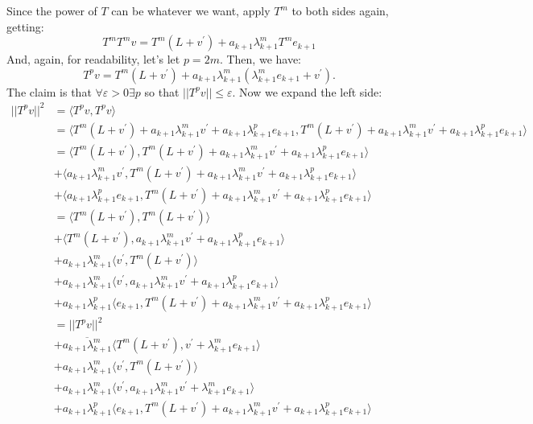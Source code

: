 \documentclass{article}
\begin{document}
Since the power of $T$ can be whatever we want, apply $T^{m}$ to both sides again, getting:
\begin{equation*}
T^{m}T^{m}v = T^{m}(L + v^{\prime}) + a_{k+1}\lambda^{m}_{k+1}T^{m}e_{k+1}
\end{equation*}
And, again, for readability, let's let $p = 2m$. Then, we have:
\begin{equation*}
T^{p}v = T^{m}(L + v^{\prime}) + a_{k+1}\lambda^{m}_{k+1}(\lambda^{m}_{k+1}e_{k+1} + v^{\prime}). 
\end{equation*}
The claim is that $\forall \varepsilon>0 \exists p$ so that $||T^{p}v|| \leq \varepsilon$. Now we expand the left side:
\begin{align*}
||T^{p}v||^{2} &= \langle T^{p}v, T^{p}v \rangle\\
&= \langle T^{m}(L+v^{\prime}) + a_{k+1}\lambda^{m}_{k+1}v^{\prime} +  a_{k+1}\lambda^{p}_{k+1}e_{k+1}, T^{m}(L+v^{\prime}) + a_{k+1}\lambda^{m}_{k+1}v^{\prime} +  a_{k+1}\lambda^{p}_{k+1}e_{k+1}  \rangle\\
&= \langle T^{m}(L+v^{\prime}), T^{m}(L+v^{\prime}) + a_{k+1}\lambda^{m}_{k+1}v^{\prime} +  a_{k+1}\lambda^{p}_{k+1}e_{k+1} \rangle\\
&+ \langle a_{k+1}\lambda^{m}_{k+1}v^{\prime}, T^{m}(L+v^{\prime}) + a_{k+1}\lambda^{m}_{k+1}v^{\prime} +  a_{k+1}\lambda^{p}_{k+1}e_{k+1} \rangle\\
&+ \langle  a_{k+1}\lambda^{p}_{k+1}e_{k+1}, T^{m}(L+v^{\prime}) + a_{k+1}\lambda^{m}_{k+1}v^{\prime} +  a_{k+1}\lambda^{p}_{k+1}e_{k+1} \rangle\\
&= \langle T^{m}(L+v^{\prime}), T^{m}(L+v^{\prime}) \rangle\\
&+ \langle T^{m}(L+v^{\prime}), a_{k+1}\lambda^{m}_{k+1}v^{\prime} +  a_{k+1}\lambda^{p}_{k+1}e_{k+1} \rangle\\
&+ a_{k+1}\lambda^{m}_{k+1} \langle v^{\prime}, T^{m}(L+v^{\prime})\rangle\\
&+ a_{k+1}\lambda^{m}_{k+1}\langle v^{\prime}, a_{k+1}\lambda^{m}_{k+1}v^{\prime} +  a_{k+1}\lambda^{p}_{k+1}e_{k+1}\rangle\\
&+ a_{k+1}\lambda^{p}_{k+1} \langle e_{k+1}, T^{m}(L+v^{\prime}) + a_{k+1}\lambda^{m}_{k+1}v^{\prime} +  a_{k+1}\lambda^{p}_{k+1}e_{k+1} \rangle\\
&=||T^{p}v||^{2}\\
&+\overline{a_{k+1}\lambda^{m}_{k+1}}\langle T^{m}(L+v^{\prime}), v^{\prime} +  \lambda^{m}_{k+1}e_{k+1} \rangle\\
&+ a_{k+1}\lambda^{m}_{k+1} \langle v^{\prime}, T^{m}(L+v^{\prime})\rangle\\
&+ a_{k+1}\lambda^{m}_{k+1} \langle v^{\prime},  a_{k+1}\lambda^{m}_{k+1}v^{\prime} +\lambda^{m}_{k+1}e_{k+1} \rangle\\
&+ a_{k+1}\lambda^{p}_{k+1} \langle e_{k+1}, T^{m}(L+v^{\prime}) + a_{k+1}\lambda^{m}_{k+1}v^{\prime} +  a_{k+1}\lambda^{p}_{k+1}e_{k+1} \rangle\\
\end{align*}
\end{document}
